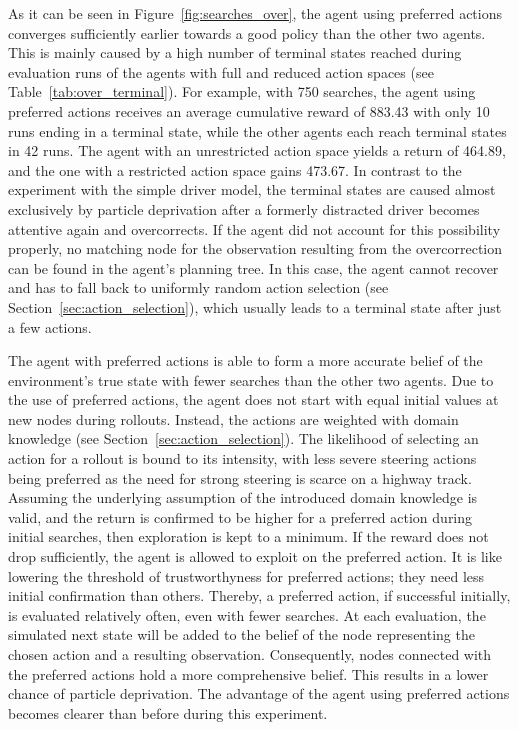 

As it can be seen in Figure~\ref{fig:searches_over}, the agent using preferred actions converges sufficiently earlier towards a good policy than the other two agents. This is mainly caused by a high number of terminal states reached during evaluation runs of the agents with full and reduced action spaces (see Table~\ref{tab:over_terminal}). For example, with 750 searches, the agent using preferred actions receives an average cumulative reward of 883.43 with only 10 runs ending in a terminal state, while the other agents each reach terminal states in 42 runs. The agent with an unrestricted action space yields a return of 464.89, and the one with a restricted action space gains 473.67. In contrast to the experiment with the simple driver model, the terminal states are caused almost exclusively by particle deprivation after a formerly distracted driver becomes attentive again and overcorrects. If the agent did not account for this possibility properly, no matching node for the observation resulting from the overcorrection can be found in the agent's planning tree. In this case, the agent cannot recover and has to fall back to uniformly random action selection (see Section~\ref{sec:action_selection}), which usually leads to a terminal state after just a few actions. %

The agent with preferred actions is able to form a more accurate belief of the environment's true state with fewer searches than the other two agents. Due to the use of preferred actions, the agent does not start with equal initial values at new nodes during rollouts. Instead, the actions are weighted with domain knowledge (see Section~\ref{sec:action_selection}). The likelihood of selecting an action for a rollout is bound to its intensity, with less severe steering actions being preferred as the need for strong steering is scarce on a highway track. Assuming the underlying assumption of the introduced domain knowledge is valid, and the return is confirmed to be higher for a preferred action during initial searches, then exploration is kept to a minimum. If the reward does not drop sufficiently, the agent is allowed to exploit on the preferred action. It is like lowering the threshold of trustworthyness for preferred actions; they need less initial confirmation than others. Thereby, a preferred  action, if successful initially, is evaluated relatively often, even with fewer searches. At each evaluation, the simulated next state will be added to the belief of the node representing the chosen action and a resulting observation. Consequently, nodes connected with the preferred actions hold a more comprehensive belief. This results in a lower chance of particle deprivation. The advantage of the agent using preferred actions becomes clearer than before during this experiment.

